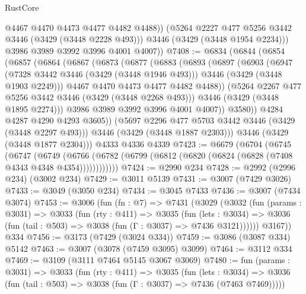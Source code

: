 \begin{lexlean}{RustCore}
\begin{coremodule}
              @4467
              @4470
              @4473
              @4477
              @4482
              @4488))
          (@5264 @2227 @477 @5256 @3442 @3446 (@3429 (@3448 @2228 @493)))
          @3446
          (@3429 (@3448 @1954 @2234)))
        @3986
        @3989
        @3992
        @3996
        @4001
        @4007))
@7408 := @6834
    (@6844
      (@6854
        (@6857
          (@6864
            (@6867
              (@6873
                (@6877
                  (@6883
                    (@6893
                      (@6897
                        (@6903
                          (@6947
                            (@7328 @3442 @3446 (@3429 (@3448 @1946 @493)))
                            @3446
                            (@3429 (@3448 @1903 @2249)))
                          @4467
                          @4470
                          @4473
                          @4477
                          @4482
                          @4488))
                      (@5264 @2267 @477 @5256 @3442 @3446 (@3429 (@3448 @2268 @493)))
                      @3446
                      (@3429 (@3448 @1895 @2274)))
                    @3986
                    @3989
                    @3992
                    @3996
                    @4001
                    @4007))
                @3580))
            @4284
            @4287
            @4290
            @4293
            @3605))
        (@5697 @2296 @477 @5703 @3442 @3446 (@3429 (@3448 @2297 @493)))
        @3446
        (@3429 (@3448 @1887 @2303)))
      @3446
      (@3429 (@3448 @1877 @2304)))
    @4333
    @4336
    @4339
@7423 := @6679
    (@6704
      (@6745
        (@6747
          (@6749
            (@6766 (@6782 (@6799 (@6812 (@6820 (@6824 (@6828 (@7408 @4343 @4348 @4354))))))))))))
@7424 := @2990 @234
@7428 := @2992 (@2996 @234) (@3002 @234)
@7429 := @3011 @5139
@7431 := @3007 (@7429 @3026)
@7433 := @3049 (@3050 @234)
@7434 := @3045 @7433
@7436 := @3007 (@7434 @3074)
@7453 := @3006
    (fun (fn : @7) =>
    @7431
      (@3029
        (@3032
          (fun (params : @3031) =>
          @3033
            (fun (rty : @411) =>
            @3035
              (fun (lets : @3034) =>
              @3036 (fun (tail : @503) => @3038 (fun (Γ : @3037) => @7436 @3121))))))
        @3167))
    @334
@7456 := @3173 (@7429 (@3024 @334))
@7459 := @3086 (@3087 @334) @5142
@7463 := @3007 (@3078 (@7459 @3095) @3099)
@7464 := @3112 @334
@7469 := @3109 (@3111 @7464 @5145 @3067 @3069)
@7480 := fun (params : @3031) =>
  @3033
    (fun (rty : @411) =>
    @3035
      (fun (lets : @3034) =>
      @3036 (fun (tail : @503) => @3038 (fun (Γ : @3037) => @7436 (@7463 @7469)))))

\end{coremodule}
\end{lexlean}
